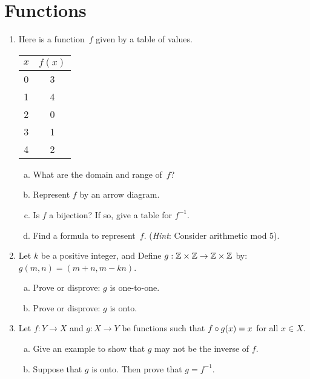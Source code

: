 \section{Functions}

\begin{enumerate}

\item
Here is a function~$f$ given by a table of values.

\begin{center}
\begin{tabular}{c|c}
$x$ & $f(x)$ \\ \hline

0 & 3 \\
1 & 4 \\
2 & 0 \\
3 & 1 \\
4 & 2 \\
\end{tabular}
\end{center}

\begin{enumerate}[(a)]
\item  \label{FunctionByTableEx-domain}
What are the domain and range  of~$f$?
\item  \label{FunctionByTableEx-pairs}
Represent $f$ by an arrow diagram.
\item
Is $f$ a bijection? If so, give a table for $f^{-1}$.
\item  \label{FunctionByTableEx-formula}
Find a formula to represent~$f$. (\emph{Hint}:  Consider arithmetic mod 5).
\end{enumerate}

\item
Let $k$ be a positive integer, and Define $g : \mathbb{Z} \times \mathbb{Z}  \rightarrow \mathbb{Z} \times \mathbb{Z}$ by: $g(m, n) = (m + n,  m - kn)$.
\begin{enumerate}[(a)]
\item
Prove or disprove:  $g$ is one-to-one.
\item
Prove or disprove:  $g$ is onto.
\end{enumerate}

\item
Let $ f:Y \rightarrow X$ and $g:X \rightarrow Y$ be functions   such that  $f \circ g(x) = x$ for all $x \in X$.
\begin{enumerate}[(a)]
\item
Give an example to show that $g$ may not be the inverse of $f$.
\item
Suppose that $g$ is onto. Then prove that $g = f^{-1}$.
\end{enumerate}


\end{enumerate}
